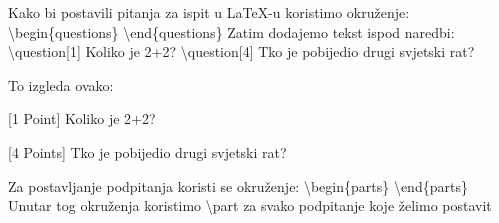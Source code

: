 \documentclass[addpoints,answers]{beamer}
\newcounter{points}
\newenvironment{questions}{\setcounter{points}{0}}{}
\newcommand{\question}[1][1]{\addtocounter{points}{#1}}
\begin{document}
\begin{frame}
Kako bi postavili pitanja za ispit u LaTeX-u koristimo okruženje:
\newline
\newline
\color{blue}
\textbackslash{begin\{questions\}}
\color{black}
\color{blue}
\newline
\newline
\textbackslash{end\{questions\}}
\color{black}
\newline
\newline
Zatim dodajemo tekst ispod naredbi:
\newline
\newline
\color{blue}
\textbackslash{question[1]}
\color{black}
\newline
Koliko je 2+2?
\newline
\newline
\color{blue}
\textbackslash{question[4]}
\color{black}
\newline
Tko je pobijedio drugi svjetski rat?

\end{frame}


\begin{frame}
\begin{questions}

To izgleda ovako:
\newline
\newline
\question[1]
[1 Point] Koliko je 2+2?
\newline
\newline
\question[4]
[4 Points] Tko je pobijedio drugi svjetski rat?
\end{questions}
\end{frame}




\begin{frame}
Za postavljanje podpitanja koristi se okruženje:
\newline
\newline
\color{blue}
\textbackslash{begin\{parts\}}
\color{black}
\newline
\newline
\color{blue}
\textbackslash{end\{parts\}}
\color{black}
\newline
\newline
Unutar tog okruženja koristimo
\newline
\newline
\color{blue}
\textbackslash{part}
\color{black}
\newline
\newline
za svako podpitanje koje želimo postavit
\end{frame}
\end{document}

